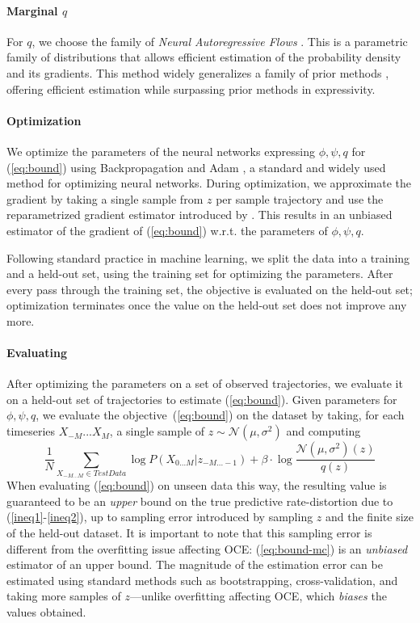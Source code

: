 \documentclass[11pt,letterpaper]{article}
\begin{document}
\paragraph{Marginal $q$}
For $q$, we choose the family of \emph{Neural Autoregressive Flows} \citep{huang-neural-2018}. 
This is a parametric family of distributions that allows efficient estimation of the probability density and its gradients.
This method widely generalizes a family of prior methods \citep{rezende-variational-2015, kingma-improving-2016, papamakarios-masked-2017}, offering efficient estimation while surpassing prior methods in expressivity.


\paragraph{Optimization}
We optimize the parameters of the neural networks expressing $\phi, \psi, q$ for (\ref{eq:bound}) using Backpropagation and Adam \citep{kingma-adam:-2014}, a standard and widely used method for optimizing neural networks.
During optimization, we approximate the gradient by taking a single sample from $z$ per sample trajectory and use the reparametrized gradient estimator introduced by \citet{kingma-auto-encoding-2014}.
This results in an unbiased estimator of the gradient of (\ref{eq:bound}) w.r.t. the parameters of $\phi, \psi, q$.

Following standard practice in machine learning, we split the data into a training and a held-out set, using the training set for optimizing the parameters.
After every pass through the training set, the objective is evaluated on the held-out set; optimization terminates once the value on the held-out set does not improve any more.


\paragraph{Evaluating}
After optimizing the parameters on a set of observed trajectories, we evaluate it on a held-out set of trajectories to estimate (\ref{eq:bound}).
Given parameters for $\phi, \psi, q$, we evaluate the objective~(\ref{eq:bound}) on the dataset by taking, for each timeseries $X_{-M}...X_M$, a single sample of $z  \sim \mathcal{N}(\mu, \sigma^2)$ and computing
\begin{equation}\label{eq:bound-mc}
	\frac{1}{N}	\sum_{X_{-M...M} \in TestData}	\log P(X_{0\dots M} | z_{-M...-1}) + \beta \cdot \log \frac{\mathcal{N}(\mu, \sigma^2)(z)}{q(z)}
\end{equation}
When evaluating (\ref{eq:bound}) on unseen data this way, the resulting value is guaranteed to be an \emph{upper} bound on the true predictive rate-distortion due to (\ref{ineq1}-\ref{ineq2}), up to sampling error introduced by sampling $z$ and the finite size of the held-out dataset.
It is important to note that this sampling error is different from the overfitting issue affecting OCE: 
(\ref{eq:bound-mc}) is an \emph{unbiased} estimator of an upper bound.
The magnitude of the estimation error can be estimated using standard methods such as bootstrapping, cross-validation, and taking more samples of $z$---unlike overfitting affecting OCE, which \emph{biases} the values obtained.
\end{document}
